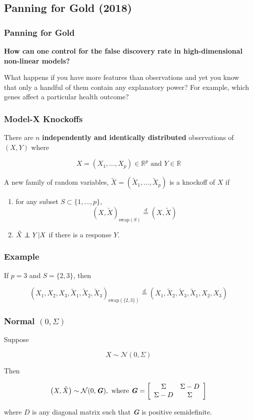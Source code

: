 \documentclass[
	11pt, %
]{beamer}
\newcommand\independent{\protect\mathpalette{\protect\independenT}{\perp}}
\def\independenT#1#2{\mathrel{\rlap{$#1#2$}\mkern2mu{#1#2}}}
\begin{document}
\subsection{Panning for Gold (2018)}

\begin{frame}
	\frametitle{Panning for Gold}
	
	\begin{center}
		\textbf{How can one control for the false discovery rate in high-dimensional non-linear models?}
		
		\bigskip
		
		What happens if you have more features than observations and yet you know that only a handful of them contain any explanatory power? For example, which genes affect a particular health outcome?
	\end{center}
\end{frame}

\begin{frame}
	\frametitle{Model-X Knockoffs}
	There are $n$ \textbf{independently and identically distributed} observations of $(X,Y)$ where
	
	$$X=(X_1,\dots,X_p)\in\mathbb{R}^p\text{ and }Y\in\mathbb{R}$$
	
	\bigskip
	
	A new family of random variables, $\tilde{X}=\left(\tilde{X}_1,\dots,\tilde{X}_p\right)$ is a knockoff of $X$ if
	
	\begin{enumerate}
		\item for any subset $S\subset\{1,\dots,p\}$, $$\left(X,\tilde{X}\right)_{\text{swap}(S)}\stackrel{d}{=}\left(X,\tilde{X}\right)$$
		\item $\tilde{X}\independent Y | X$ if there is a response $Y$.
	\end{enumerate}
\end{frame}

\begin{frame}
	\frametitle{Example}
	
	If $p=3$ and $S=\{2,3\}$, then
	
	$$\left(X_1,X_2,X_3,\tilde{X}_1,\tilde{X}_2,\tilde{X}_3\right)_{\text{swap}(\{2,3\})}\stackrel{d}{=}\left(X_1,\tilde{X}_2,\tilde{X}_3,\tilde{X}_1,X_2,X_3\right)$$
\end{frame}

\begin{frame}
	\frametitle{Normal $(0,\Sigma)$}
	Suppose 
	
	$$X\sim\mathcal{N}(0,\Sigma)$$
	\bigskip
	
	Then
	
	$$\left(X,\tilde{X}\right)\sim\mathcal{N}(0,\textbf{\textit{G}}),\text{  where  }\textbf{\textit{G}}=\left[\begin{array}{c c}
		\Sigma & \Sigma - D \\
		\Sigma - D & \Sigma
	\end{array}\right]$$
	
	\bigskip
	
	where $D$ is any diagonal matrix such that \textbf{\textit{G}} is positive semidefinite.
\end{frame}
\end{document}
